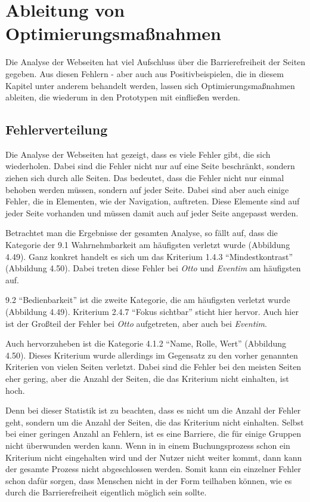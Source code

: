 \section{Ableitung von Optimierungsmaßnahmen}

Die Analyse der Webseiten hat viel Aufschluss über die Barrierefreiheit der Seiten gegeben. Aus diesen Fehlern - aber auch aus Positivbeispielen, die in diesem Kapitel unter anderem behandelt werden, lassen sich Optimierungsmaßnahmen ableiten, die wiederum in den Prototypen mit einfließen werden.

\subsection{Fehlerverteilung}
Die Analyse der Webseiten hat gezeigt, dass es viele Fehler gibt, die sich wiederholen. Dabei sind die Fehler nicht nur auf eine Seite beschränkt, sondern ziehen sich durch alle Seiten. Das bedeutet, dass die Fehler nicht nur einmal behoben werden müssen, sondern auf jeder Seite. Dabei sind aber auch einige Fehler, die in Elementen, wie der Navigation, auftreten. Diese Elemente sind auf jeder Seite vorhanden und müssen damit auch auf jeder Seite angepasst werden.

Betrachtet man die Ergebnisse der gesamten Analyse, so fällt auf, dass die Kategorie der 9.1 Wahrnehmbarkeit am häufigsten verletzt wurde (Abbildung 4.49). Ganz konkret handelt es sich um das Kriterium 1.4.3 \enquote{Mindestkontrast} (Abbildung 4.50). Dabei treten diese Fehler bei \textit{Otto} und \textit{Eventim} am häufigsten auf. 

9.2 \enquote{Bedienbarkeit} ist die zweite Kategorie, die am häufigsten verletzt wurde (Abbildung 4.49). Kriterium 2.4.7 \enquote{Fokus sichtbar} sticht hier hervor. Auch hier ist der Großteil der Fehler bei \textit{Otto} aufgetreten, aber auch bei \textit{Eventim}.

Auch hervorzuheben ist die Kategorie 4.1.2 \enquote{Name, Rolle, Wert} (Abbildung 4.50). Dieses Kriterium wurde allerdings im Gegensatz zu den vorher genannten Kriterien von vielen Seiten verletzt. Dabei sind die Fehler bei den meisten Seiten eher gering, aber die Anzahl der Seiten, die das Kriterium nicht einhalten, ist hoch.

Denn bei dieser Statistik ist zu beachten, dass es nicht um die Anzahl der Fehler geht, sondern um die Anzahl der Seiten, die das Kriterium nicht einhalten. Selbst bei einer geringen Anzahl an Fehlern, ist es eine Barriere, die für einige Gruppen nicht überwunden werden kann. Wenn in in einem Buchungsprozess schon ein Kriterium nicht eingehalten wird und der Nutzer nicht weiter kommt, dann kann der gesamte Prozess nicht abgeschlossen werden. Somit kann ein einzelner Fehler schon dafür sorgen, dass Menschen nicht in der Form teilhaben können, wie es durch die Barrierefreiheit eigentlich möglich sein sollte.

